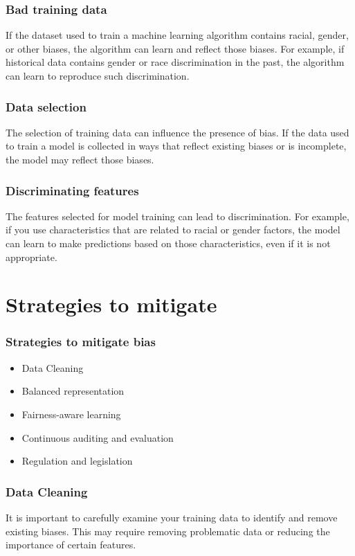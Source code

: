 \documentclass{beamer}
\numberwithin{figure}{section}
\numberwithin{equation}{section}
\begin{document}
\begin{frame}
 \frametitle{Bad training data}
 If the dataset used to train a machine learning algorithm contains racial, gender, or other biases, the algorithm can learn and reflect those biases. For example, if historical data contains gender or race discrimination in the past, the algorithm can learn to reproduce such discrimination.
\end{frame}

\begin{frame}
 \frametitle{Data selection}
 The selection of training data can influence the presence of bias. If the data used to train a model is collected in ways that reflect existing biases or is incomplete, the model may reflect those biases.
\end{frame}

\begin{frame}
 \frametitle{Discriminating features}
 The features selected for model training can lead to discrimination. For example, if you use characteristics that are related to racial or gender factors, the model can learn to make predictions based on those characteristics, even if it is not appropriate.
\end{frame}


\section{Strategies to mitigate}
\begin{frame}
\frametitle{Strategies to mitigate bias}
 \begin{itemize}
    \item Data Cleaning
    \item Balanced representation 
    \item Fairness-aware learning
    \item Continuous auditing and evaluation
    \item Regulation and legislation
\end{itemize}
\end{frame}

\begin{frame}
 \frametitle{Data Cleaning}
    It is important to carefully examine your training data to identify and remove existing biases. This may require removing problematic data or reducing the importance of certain features.
\end{frame}
\end{document}
